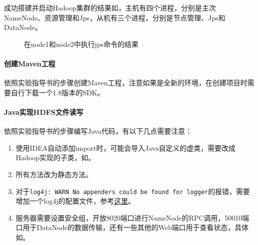 \documentclass[lang=cn,11pt,a4paper,cite=authornum]{paper}
\begin{document}
成功搭建并启动Hadoop集群的结果如，主机有四个进程，分别是主次NameNode、资源管理和Jps，从机有三个进程，分别是节点管理、Jps和DataNode。

\begin{figure}[htbp]
    \centering
    \caption{在node1和node2中执行jps命令的结果\label{fig:jps}}
\end{figure}

\paragraph{创建Maven工程}

依照实验指导书的步骤创建Maven工程，注意如果是全新的环境，在创建项目时需要自行下载一个1.8版本的SDK。

\paragraph{Java实现HDFS文件读写}

依照实验指导书的步骤编写Java代码，有以下几点需要注意：

\begin{enumerate}
    \item 使用IDEA自动添加import时，可能会导入Java自定义的虚类，需要改成Hadoop实现的子类，如。
    \item 所有方法改为静态方法。
    \item 对于\texttt{log4j: WARN No appenders could be found for logger}的报错，需要增加一个log4j的配置文件，参考\href{https://www.jianshu.com/p/ea2de77eb9d4}{这里}。
    \item 服务器需要设置安全组，开放8020端口进行NameNode的RPC调用，50010端口用于DataNode的数据传输，还有一些其他的Web端口用于查看状态，具体如。
\end{enumerate}
\end{document}
